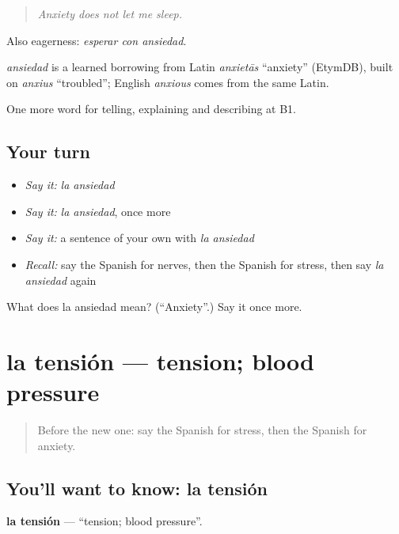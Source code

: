 \begin{quote}
\emph{Anxiety does not let me sleep.}
\end{quote}

Also eagerness: \emph{esperar con ansiedad}.

\begin{cousinweb}
\emph{ansiedad} is a learned borrowing from Latin \emph{anxietās} \textquotedblleft{}anxiety\textquotedblright{} (EtymDB), built on \emph{anxius} \textquotedblleft{}troubled\textquotedblright{}; English \emph{anxious} comes from the same Latin.
\end{cousinweb}

\begin{grammarlens}[title={What you've built}]
One more word for telling, explaining and describing at B1.
\end{grammarlens}

\subsection*{Your turn}
\begin{itemize}
\raggedright
  \item \emph{Say it:} \emph{la ansiedad}
  \item \emph{Say it:} \emph{la ansiedad}, once more
  \item \emph{Say it:} a sentence of your own with \emph{la ansiedad}
  \item \emph{Recall:} say the Spanish for nerves, then the Spanish for stress, then say \emph{la ansiedad} again
\end{itemize}

\begin{tcolorbox}[breakable,colback=teal!4,colframe=teal!35!black,title={Before you move on}]
What does la ansiedad mean? (\textquotedblleft{}Anxiety\textquotedblright{}.) Say it once more.
\end{tcolorbox}
\section[la tensión]{la tensión — tension; blood pressure}

\label{lesson:ES-C710-tension}



\begin{quote}
Before the new one: say the Spanish for stress, then the Spanish for anxiety.
\end{quote}

\subsection*{You'll want to know: la tensión}
\textbf{la tensión} — \textquotedblleft{}tension; blood pressure\textquotedblright{}.

